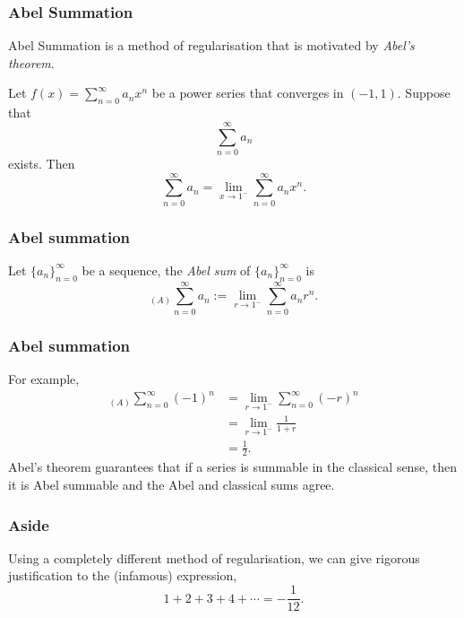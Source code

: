\documentclass{beamer}
\begin{document}
\begin{frame}
    \frametitle{Abel Summation}
    Abel Summation is a method of regularisation that is motivated
    by \emph{Abel's theorem}.
    \begin{theorem}
        Let $f(x) = \sum_{n=0}^\infty a_n x^n$ be a power
        series that converges in $(-1,1)$. Suppose
        that
        \begin{equation*}
            \sum_{n=0}^\infty a_n
        \end{equation*}
        exists. Then
        \begin{equation*}
            \sum_{n=0}^\infty a_n = \lim_{x\rightarrow 1^{-}} \sum_{n=0}^\infty a_nx^n.
        \end{equation*}
    \end{theorem}
\end{frame}

\begin{frame}
    \frametitle{Abel summation}
    \begin{definition}
        Let $\{a_n\}_{n=0}^\infty$ be a sequence, the \emph{Abel sum}
        of $\{a_n\}_{n=0}^\infty$ is
        \begin{equation*}
            _{(A)}\sum_{n=0}^\infty a_n := \lim_{r\rightarrow 1^-} \sum_{n=0}^\infty a_n r^n.
        \end{equation*}
    \end{definition}
\end{frame}

\begin{frame}
    \frametitle{Abel summation}
    For example,
    \begin{align*}
        _{(A)}\sum_{n=0}^\infty (-1)^n &= \lim_{r\rightarrow 1^-} \sum_{n=0}^\infty (-r)^n \\
                                       &= \lim_{r\rightarrow 1^-} \frac{1}{1+r}\\
                                       &= \frac{1}{2}.
    \end{align*}
    Abel's theorem guarantees that if a series is summable in the classical
    sense, then it is Abel summable and the Abel and classical sums agree.
\end{frame}

\begin{frame}
    \frametitle{Aside}
    Using a completely different method of regularisation, we
    can give rigorous justification to the (infamous) expression,
    \begin{equation*}
        1+2+3+4+\cdots = -\frac{1}{12}.
    \end{equation*}
\end{frame}
\end{document}
